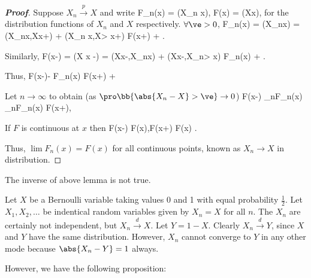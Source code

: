 \begin{proof}[\bf Proof]
Suppose $X_n \stackrel{p}{\to} X$ and write
\be
F_n(x) = \pro(X_n \leq x), \quad\quad F(x) = \pro(X\leq x),
\ee
for the distribution functions of $X_n$ and $X$ respectively. $\forall \ve>0$,
\be
F_n(x) = \pro(X_n\leq x) = \pro(X_n\leq x,X\leq x+\ve) + \pro(X_n \leq x,X> x+\ve) \leq F(x+\ve) + \pro{}.
\ee

Similarly,
\be
F(x-\ve) = \pro(X \leq x -\ve) = \pro(X\leq x-\ve,X_n\leq x) + \pro(X\leq x-\ve,X_n> x) \leq F_n(x) + \pro{}.
\ee

Thus,
\be
F(x-\ve)- \pro{} \leq F_n(x) \leq F(x+\ve) + \pro{}
\ee

Let $n\to \infty$ to obtain (as $\pro\bb{\abs{X_n -X}>\ve}\to 0$)
\be
F(x-\ve) \leq \liminf_{n\to \infty }F_n(x) \leq \limsup_{n\to \infty }F_n(x) \leq F(x+\ve),
\ee

If $F$ is continuous at $x$ then
\be
F(x-\ve) \ua F(x),\quad\quad F(x+\ve) \da F(x) \quad{}\ve {}.
\ee

Thus, $\lim F_n(x) = F(x)$ for all continuous points, known as $X_n \to X$ in distribution.
\end{proof}

\begin{remark}
The inverse of above lemma is not true.
\end{remark}

\begin{example}
Let $X$ be a Bernoulli variable taking values 0 and 1 with equal probability $\frac 12$. Let $X_1,X_2,\dots$ be indentical random variables given by $X_n= X$ for all $n$. The $X_n$ are certainly not independent, but $X_n \stackrel{d}{\to} X$. Let $Y=1-X$. Clearly $X_n \stackrel{d}{\to} Y$, since $X$ and $Y$ have the same distribution. However, $X_n$ cannot converge to $Y$ in any other mode because $\abs{X_n - Y} =1$ always.
\end{example}

However, we have the following proposition:


